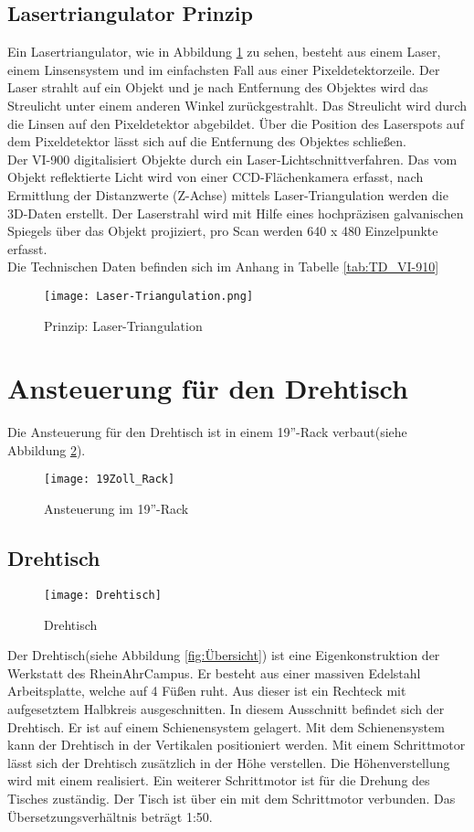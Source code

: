 \subsection{Lasertriangulator Prinzip}
Ein Lasertriangulator, wie in Abbildung \ref{fig:LaserTriangulator} zu sehen, besteht aus einem Laser, einem Linsensystem und im einfachsten Fall aus einer Pixeldetektorzeile. Der Laser strahlt auf ein Objekt und je nach Entfernung des Objektes wird das Streulicht unter einem anderen Winkel zurückgestrahlt. Das Streulicht wird durch die Linsen auf den Pixeldetektor abgebildet. Über die Position des Laserspots auf dem Pixeldetektor lässt sich auf die Entfernung des Objektes schließen.\\
Der VI-900 digitalisiert Objekte durch ein Laser-Lichtschnittverfahren. Das vom Objekt reflektierte Licht wird von einer CCD-Flächenkamera erfasst, nach Ermittlung der Distanzwerte (Z-Achse) mittels Laser-Triangulation werden die 3D-Daten erstellt. Der Laserstrahl wird mit Hilfe eines hochpräzisen galvanischen Spiegels über das Objekt projiziert, pro Scan werden 640 x 480 Einzelpunkte erfasst.\cite{Minolta:Einleitung}\\
Die Technischen Daten befinden sich im Anhang in Tabelle \ref{tab:TD_VI-910}
\begin{figure}[htb]
\centering
\texttt{[image: Laser-Triangulation.png]}
\caption{Prinzip: Laser-Triangulation}
\label{fig:LaserTriangulator}
\end{figure}
\section{Ansteuerung für den Drehtisch}
Die Ansteuerung für den Drehtisch ist in einem 19''-Rack verbaut(siehe Abbildung \ref{fig:19Zoll_Rack}).
\begin{figure}[htb]
\centering
\texttt{[image: 19Zoll\_Rack]}
\caption{Ansteuerung im 19''-Rack}
\label{fig:19Zoll_Rack}
\end{figure}
\subsection{Drehtisch}
\begin{figure}[htb]
\centering
\texttt{[image: Drehtisch]}
\caption{Drehtisch}
\label{fig:Drehtisch}
\end{figure}
Der Drehtisch(siehe Abbildung \ref{fig:Übersicht}) ist eine Eigenkonstruktion der Werkstatt des RheinAhrCampus. Er besteht aus einer massiven Edelstahl Arbeitsplatte, welche auf 4 Füßen ruht. Aus dieser ist ein Rechteck mit aufgesetztem Halbkreis ausgeschnitten. In diesem Ausschnitt befindet sich der Drehtisch. Er ist auf einem Schienensystem gelagert. Mit dem Schienensystem kann der Drehtisch in der Vertikalen positioniert werden. Mit einem Schrittmotor lässt sich der Drehtisch zusätzlich in der Höhe verstellen. Die Höhenverstellung wird mit einem  realisiert. Ein weiterer Schrittmotor ist für die Drehung des Tisches zuständig. Der Tisch ist über ein  mit dem Schrittmotor verbunden. Das Übersetzungsverhältnis beträgt 1:50.  
 
